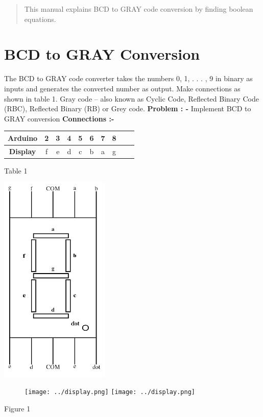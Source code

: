 \documentclass{article}
\begin{document}
\begin{multicols}{2}
\begin{center}
\author{Valmeekam Navya}
\begin{tableofcontents}
\begin{abstract}
    This manual explains BCD to GRAY code conversion by finding boolean equations.
\end{abstract}
\section{BCD to GRAY Conversion}
The BCD to GRAY code converter takes the numbers 0, 1, . . . , 9 in binary as inputs and generates the converted number as output. Make connections as shown in table 1.
Gray code – also known as Cyclic Code, Reflected Binary Code (RBC), Reflected Binary (RB) or Grey code.
\newline
\newline
\textbf{Problem : -}
Implement BCD to GRAY conversion 
\newline
\vspace{4cm}
\newline
\newline
\newline
\newline
\newline
\textbf{Connections :-}
\newline
\newline
\begin{tabular}{|c|c|c|c|c|c|c|c|c|c|}
\hline
\textbf{Arduino} & 2 & 3 & 4 & 5 & 6 & 7 & 8  \\
\hline
\textbf{Display} & {f} & {e} & {d} & {c} & {b} & {a} & {g} \\
\hline
\end{tabular}
\newline
Table 1

\includegraphics[scale=1]{display.png} 
\begin{figure}[hbtp]
\texttt{[image: ../display.png]}
\texttt{[image: ../display.png]}
\end{figure}
\begin{center}
Figure 1
\end{center}
\newpage

\end{tableofcontents}
\end{center}
\end{multicols}
\end{document}
